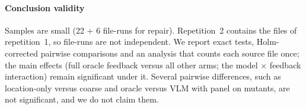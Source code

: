 \paragraph{Conclusion validity} Samples are small (22 + 6 file-runs for repair). Repetition~2 contains the files of repetition~1, so file-runs are not independent. We report exact tests, Holm-corrected pairwise comparisons and an analysis that counts each source file once; the main effects (full oracle feedback versus all other arms; the model $\times$ feedback interaction) remain significant under it. Several pairwise differences, such as location-only versus coarse and oracle versus VLM with panel on mutants, are not significant, and we do not claim them.
